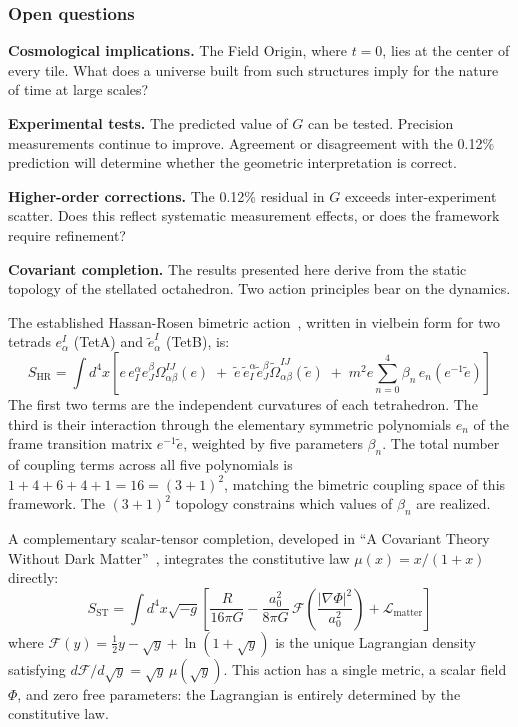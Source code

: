 \documentclass[aps,prd,preprint,superscriptaddress,showpacs,preprintnumbers,amsmath,amssymb,nofootinbib]{revtex4-2}
\begin{document}
\subsubsection*{Open questions}

\textbf{Cosmological implications.} The Field Origin, where $t = 0$, lies at the center of every tile. What does a universe built from such structures imply for the nature of time at large scales?

\textbf{Experimental tests.} The predicted value of $G$ can be tested. Precision measurements continue to improve. Agreement or disagreement with the 0.12\% prediction will determine whether the geometric interpretation is correct.

\textbf{Higher-order corrections.} The 0.12\% residual in $G$ exceeds inter-experiment scatter. Does this reflect systematic measurement effects, or does the framework require refinement?

\textbf{Covariant completion.} The results presented here derive from the static topology of the stellated octahedron. Two action principles bear on the dynamics.

The established Hassan-Rosen bimetric action~\cite{hassan2012}, written in vielbein form for two tetrads $e^I_\alpha$ (TetA) and $\tilde{e}^I_\alpha$ (TetB), is:
\begin{equation}
S_{\text{HR}} = \int d^4x \left[ e\, e_I^\alpha e_J^\beta \Omega^{IJ}_{\alpha\beta}(e) \;+\; \tilde{e}\, \tilde{e}_I^\alpha \tilde{e}_J^\beta \tilde{\Omega}^{IJ}_{\alpha\beta}(\tilde{e}) \;+\; m^2 e \sum_{n=0}^{4} \beta_n \, e_n(e^{-1}\tilde{e}) \right]
\label{eq:hassan-rosen}
\end{equation}
The first two terms are the independent curvatures of each tetrahedron. The third is their interaction through the elementary symmetric polynomials $e_n$ of the frame transition matrix $e^{-1}\tilde{e}$, weighted by five parameters $\beta_n$. The total number of coupling terms across all five polynomials is $1 + 4 + 6 + 4 + 1 = 16 = (3+1)^2$, matching the bimetric coupling space of this framework. The $(3+1)^2$ topology constrains which values of $\beta_n$ are realized.

A complementary scalar-tensor completion, developed in ``A Covariant Theory Without Dark Matter''~\cite{paper2}, integrates the constitutive law $\mu(x) = x/(1+x)$ directly:
\begin{equation}
S_{\text{ST}} = \int d^4x \sqrt{-g} \left[ \frac{R}{16\pi G} - \frac{a_0^2}{8\pi G}\,\mathcal{F}\!\left(\frac{|\nabla\Phi|^2}{a_0^2}\right) + \mathcal{L}_{\text{matter}} \right]
\label{eq:scalar-tensor}
\end{equation}
where $\mathcal{F}(y) = \tfrac{1}{2}y - \sqrt{y} + \ln(1 + \sqrt{y})$ is the unique Lagrangian density satisfying $d\mathcal{F}/d\sqrt{y} = \sqrt{y}\,\mu(\sqrt{y})$. This action has a single metric, a scalar field $\Phi$, and zero free parameters: the Lagrangian is entirely determined by the constitutive law.
\end{document}
